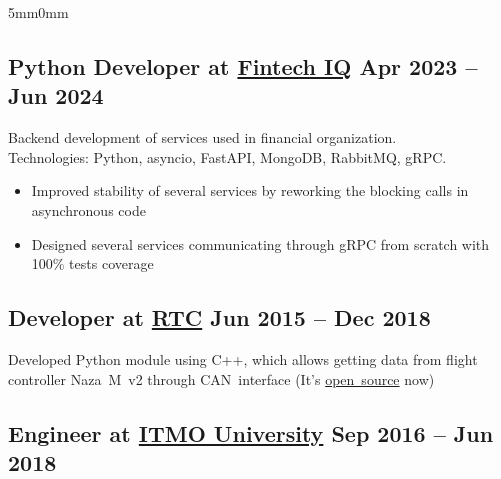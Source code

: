 \documentclass[10pt]{article}
\newcommand{\lmvalue}{5mm}
\newcommand{\rmvalue}{0mm}
\begin{document}
\begin{changemargin}{\lmvalue}{\rmvalue}
	\subsection*{Python Developer at \href{https://www.linkedin.com/company/fintech-iq/}{Fintech IQ}
		\hfill {\color{gray}Apr 2023 – Jun 2024}}

	Backend development of services used in financial organization.\\
	Technologies: Python, asyncio, FastAPI, MongoDB, RabbitMQ, gRPC.\@
	\begin{itemize}
		\item Improved stability of several services by reworking the blocking calls in asynchronous code
		\item Designed several services communicating through gRPC from scratch with 100\% tests coverage
	\end{itemize}

	\subsection*{Developer at \href{https://er.rtc.ru/en/}{RTC}
		\hfill {\color{gray}Jun 2015 – Dec 2018}}

	Developed Python module using C++, which allows getting data from flight controller Naza~M~v2 through
	CAN~interface (It's \href{https://github.com/viktorvorobev/NazaCanDecoder}{open~source} now)

	\subsection*{Engineer at \href{https://en.itmo.ru/}{ITMO University}
		\hfill {\color{gray}Sep 2016 – Jun 2018}}

\end{changemargin}
\end{document}
